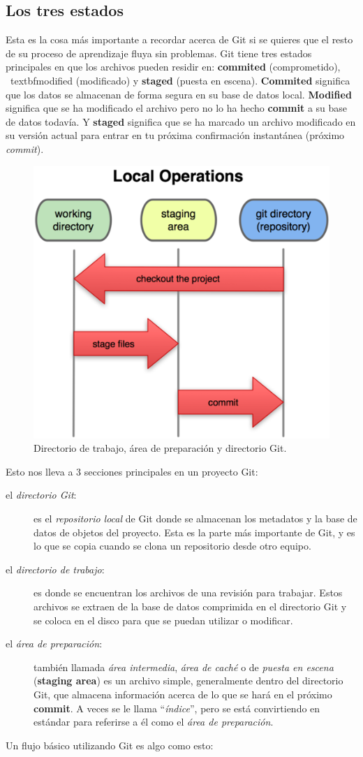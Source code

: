 \documentclass[12pt, spanish, oneside, onecolumn, a4paper]{report}
\begin{document}
\subsection{Los tres estados} 
\label{sec:threestates} Esta es la cosa más importante a recordar acerca de Git si se quieres que el resto de su proceso de aprendizaje fluya sin problemas. Git tiene tres estados principales en que los archivos pueden residir en: 
\textbf{commited} (comprometido), 
\ textbf{modified} (modificado) y 
\textbf{staged} (puesta en escena). 
\textbf{Commited} significa que los datos se almacenan de forma segura en su base de datos local. 
\textbf{Modified} significa que se ha modificado el archivo pero no lo ha hecho 
\textbf{commit} a su base de datos todavía. Y 
\textbf{staged} significa que se ha marcado un archivo modificado en su versión actual para entrar en tu próxima confirmación instantánea (próximo 
\emph{commit}). 
\begin{figure} 
  \begin{center} 
    \includegraphics[width=.45\textwidth,keepaspectratio=true]{18333fig0106-tn.png} 
  \end{center} 
  \caption{Directorio de trabajo, área de preparación y directorio Git.} 
  \label{gitsnapshot} 
\end{figure} Esto nos lleva a 3 secciones principales en un proyecto Git: 
\begin{description} 
\item [el 
  \emph{directorio Git}:] es el 
  \emph{repositorio local} de Git donde se almacenan los metadatos y la base de datos de objetos del proyecto. Esta es la parte más importante de Git, y es lo que se copia cuando se clona un repositorio desde otro equipo. 
\item [el 
  \emph{directorio de trabajo}:] es donde se encuentran los archivos de una revisión para trabajar. Estos archivos se extraen de la base de datos comprimida en el directorio Git y se coloca en el disco para que se puedan utilizar o modificar. 
\item [el 
  \emph{área de preparación}:] también llamada 
  \emph{área intermedia}, 
  \emph{área de caché} o de 
  \emph{puesta en escena} (\textbf{staging area}) es un archivo simple, generalmente dentro del directorio Git, que almacena información acerca de lo que se hará en el próximo 
  \textbf{commit}. A veces se le llama ``\emph{índice}'', pero se está convirtiendo en estándar para referirse a él como el 
  \emph{área de preparación}. 
\end{description} Un flujo básico utilizando Git es algo como esto: 
\end{document}
